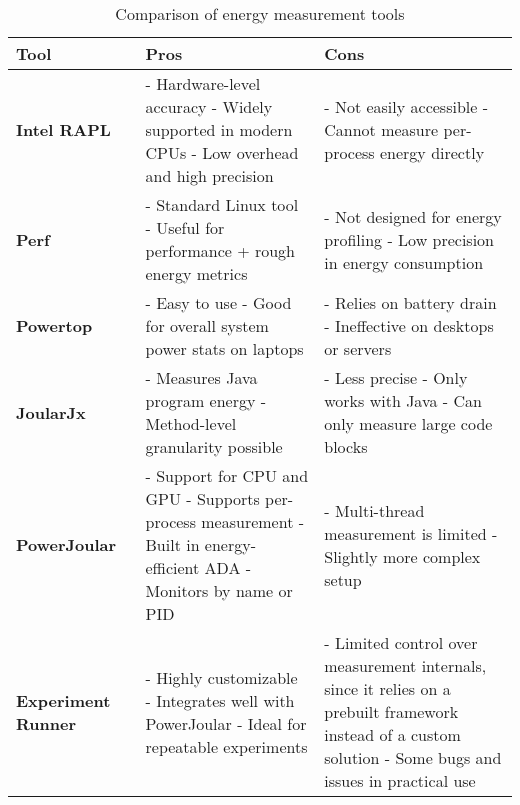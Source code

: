 \begin{table}[H]%
\centering
\caption{Comparison of energy measurement tools}
\begin{tabular}{|p{2.8cm}|p{5.4cm}|p{5.4cm}|}
\hline
\textbf{Tool} & \textbf{Pros} & \textbf{Cons} \\
\hline
\textbf{Intel RAPL}~\cite{intel_rapl} & 
- Hardware-level accuracy \newline
- Widely supported in modern CPUs \newline
- Low overhead and high precision & 
- Not easily accessible \newline
- Cannot measure per-process energy directly \\
\hline
\textbf{Perf}~\cite{perfwiki_main} & 
- Standard Linux tool \newline
- Useful for performance + rough energy metrics & 
- Not designed for energy profiling \newline
- Low precision in energy consumption \\
\hline
\textbf{Powertop}~\cite{archlinux_powertop} & 
- Easy to use \newline
- Good for overall system power stats on laptops & 
- Relies on battery drain \newline
- Ineffective on desktops or servers \\
\hline
\textbf{JoularJx}~\cite{noureddine-ie-2022} & 
- Measures Java program energy \newline
- Method-level granularity possible & 
- Less precise \newline
- Only works with Java \newline
- Can only measure large code blocks \\
\hline
\textbf{PowerJoular}~\cite{noureddine-ie-2022} & 
- Support for CPU and GPU \newline
- Supports per-process measurement \newline
- Built in energy-efficient ADA \newline
- Monitors by name or PID & 
- Multi-thread measurement is limited \newline
- Slightly more complex setup \\
\hline
\textbf{Experiment Runner}~\cite{S2_Group_Experiment_Runner} & 
- Highly customizable \newline
- Integrates well with PowerJoular \newline
- Ideal for repeatable experiments & 
- Limited control over measurement internals, since it relies on a prebuilt framework instead of a custom solution \newline
- Some bugs and issues in practical use \\
\hline
\end{tabular}
\label{tab:tool_comparison}
\end{table}



